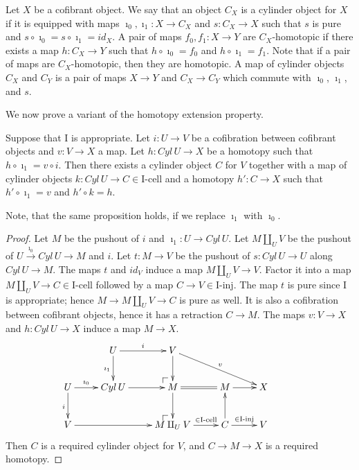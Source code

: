 \documentclass{amsart}
\makeatletter
\theoremstyle{definition}
\newcommand{\I}{\mathrm{I}}
\newcommand{\class}[2]{#1\text{-}\mathrm{#2}}
\newcommand{\Iinj}[1][\I]{\class{#1}{inj}}
\newcommand{\Icell}[1][\I]{\class{#1}{cell}}
\newcommand{\po}[1][dr]{\save*!/#1+1.2pc/#1:(1,-1)@^{|-}\restore}
\makeatother
\begin{document}
Let $X$ be a cofibrant object.
We say that an object $C_X$ is a cylinder object for $X$ if it is equipped with maps $\imath_0,\imath_1 : X \to C_X$
and $s : C_X \to X$ such that $s$ is pure and $s \circ \imath_0 = s \circ \imath_1 = id_X$.
A pair of maps $f_0,f_1 : X \to Y$ are $C_X$-homotopic if there exists a map
$h : C_X \to Y$ such that $h \circ \imath_0 = f_0$ and $h \circ \imath_1 = f_1$.
Note that if a pair of maps are $C_X$-homotopic, then they are homotopic.
A map of cylinder objects $C_X$ and $C_Y$ is a pair of maps $X \to Y$
and $C_X \to C_Y$ which commute with $\imath_0$, $\imath_1$, and $s$.

We now prove a variant of the homotopy extension property.

\begin{prop}
Suppose that $\I$ is appropriate.
Let $i : U \to V$ be a cofibration between cofibrant objects and $v : V \to X$ a map.
Let $h : Cyl\,U \to X$ be a homotopy such that $h \circ \imath_1 = v \circ i$.
Then there exists a cylinder object $C$ for $V$ together with a map of cylinder objects
$k : Cyl\,U \to C \in \Icell$ and a homotopy $h' : C \to X$ such that $h' \circ \imath_1 = v$ and $h' \circ k = h$.
\end{prop}
Note, that the same proposition holds, if we replace $\imath_1$ with $\imath_0$.
\begin{proof}
Let $M$ be the pushout of $i$ and $\imath_1 : U \to Cyl\,U$.
Let $M \amalg_U V$ be the pushout of $U \overset{\imath_0}\to Cyl\,U \to M$ and $i$.
Let $t : M \to V$ be the pushout of $s : Cyl\,U \to U$ along $Cyl\,U \to M$.
The maps $t$ and $id_V$ induce a map $M \amalg_U V \to V$.
Factor it into a map $M \amalg_U V \to C \in \Icell$ followed by a map $C \to V \in \Iinj$.
The map $t$ is pure since $\I$ is appropriate; hence $M \to M \amalg_U V \to C$ is pure as well.
It is also a cofibration between cofibrant objects, hence it has a retraction $C \to M$.
The maps $v : V \to X$ and $h : Cyl\,U \to X$ induce a map $M \to X$.
\[ \xymatrix{                               & U \ar[r]^i \ar[d]_{\imath_1} & V \ar[d] \ar[drr]^v     &          &        & \\
              U \ar[r]^-{\imath_0} \ar[d]_i & Cyl\,U \ar[r]                & \po M \ar[d] \ar@{=}[r] & M \ar[r] & X      & \\
              V \ar[rr]                     &      & \po M \amalg_U V \ar[r]^-{\in \Icell} & C \ar[r]^{\in \Iinj} \ar[u] & V
            } \]
Then $C$ is a required cylinder object for $V$, and $C \to M \to X$ is a required homotopy.
\end{proof}
\end{document}
